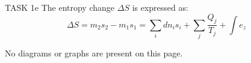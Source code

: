 TASK 1e  
The entropy change \( \Delta S \) is expressed as:  
\[
\Delta S = m_2 s_2 - m_1 s_1 = \sum_i dn_i s_i + \sum_j \frac{Q_j}{T_j} + \int e_z
\]  

No diagrams or graphs are present on this page.